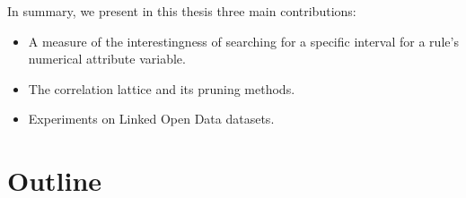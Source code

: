 In summary, we present in this thesis three main contributions:

\begin{itemize}
 \item A measure of the interestingness of searching for a specific interval for a rule's numerical attribute
variable.
 \item The correlation lattice and its pruning methods.
 \item Experiments on Linked Open Data datasets.
\end{itemize}


\section{Outline}

\begin{comment}
 The remainder of this thesis is structured as follows. In
Chapter~\ref{ch:technical_background}, we provide technical background on
MapReduce and BigTable. In Chapter~\ref{ch:related_work}, we present a
summary of previous work in the areas of duplicate and near-duplicate detection,
information retrieval on web archives, and MapReduce applications in graph
processing. Following that, we state our problem and describe solutions in
Chapter~\ref{ch:redundancy_control}. In Chapter~\ref{ch:mapreduce_impl}, we
describe an implementation of our solution using the MapReduce framework. In
Chapter~\ref{ch:experiments}, we present our experimental results. We conclude
this thesis and outline directions of future research in Chapter~\ref{ch:future_work}.
\end{comment}
